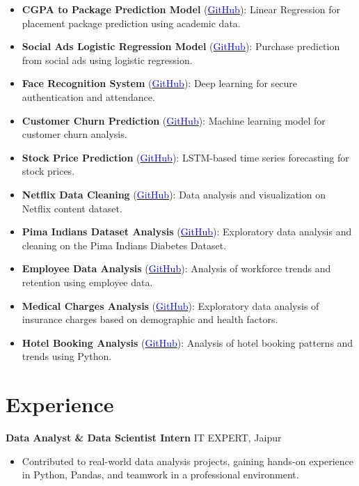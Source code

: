 \documentclass[11pt,a4paper]{article}
\begin{document}
\begin{itemize}[leftmargin=*]
    \item \textbf{CGPA to Package Prediction Model} (\href{https://github.com/alokbhateshwar/cgpa-to-package}{\textcolor{blue}{GitHub}}): Linear Regression for placement package prediction using academic data.
    \item \textbf{Social Ads Logistic Regression Model} (\href{https://github.com/alokbhateshwar/social-ads-logistic}{\textcolor{blue}{GitHub}}): Purchase prediction from social ads using logistic regression.
    \item \textbf{Face Recognition System} (\href{https://github.com/alokbhateshwar/face-recognition}{\textcolor{blue}{GitHub}}): Deep learning for secure authentication and attendance.
    \item \textbf{Customer Churn Prediction} (\href{https://github.com/alokbhateshwar/customer-churn}{\textcolor{blue}{GitHub}}): Machine learning model for customer churn analysis.
    \item \textbf{Stock Price Prediction} (\href{https://github.com/alokbhateshwar/stock-price-prediction}{\textcolor{blue}{GitHub}}): LSTM-based time series forecasting for stock prices.
    \item \textbf{Netflix Data Cleaning} (\href{https://github.com/alokbhateshwar/netflix-data-cleaning}{\textcolor{blue}{GitHub}}): Data analysis and visualization on Netflix content dataset.
    \item \textbf{Pima Indians Dataset Analysis} (\href{https://github.com/alokbhateshwar/pima-indians-analysis}{\textcolor{blue}{GitHub}}): Exploratory data analysis and cleaning on the Pima Indians Diabetes Dataset.
    \item \textbf{Employee Data Analysis} (\href{https://github.com/alokbhateshwar/employee-data-analysis}{\textcolor{blue}{GitHub}}): Analysis of workforce trends and retention using employee data.
    \item \textbf{Medical Charges Analysis} (\href{https://github.com/alokbhateshwar/medical-charges-analysis}{\textcolor{blue}{GitHub}}): Exploratory data analysis of insurance charges based on demographic and health factors.
    \item \textbf{Hotel Booking Analysis} (\href{https://github.com/alokbhateshwar/hotel-booking-analysis}{\textcolor{blue}{GitHub}}): Analysis of hotel booking patterns and trends using Python.
\end{itemize}

\section*{Experience}
\textbf{Data Analyst \& Data Scientist Intern} \hfill IT EXPERT, Jaipur \\
\begin{itemize}[leftmargin=*]
    \item Contributed to real-world data analysis projects, gaining hands-on experience in Python, Pandas, and teamwork in a professional environment.
\end{itemize}
\end{document}
